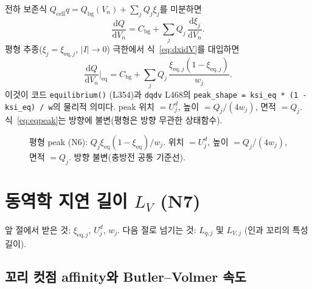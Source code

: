 \documentclass[11pt,a4paper]{article}
\newcommand{\dd}{\mathrm{d}}
\newcommand{\eq}{\mathrm{eq}}
\newcommand{\cell}{\mathrm{cell}}
\newcommand{\bg}{\mathrm{bg}}
\begin{document}
전하 보존식 $Q_\cell q = Q_\bg(V_n) + \sum_j Q_j\xi_j$를 미분하면
\begin{equation}
  \frac{\dd Q}{\dd V_n} = C_\bg + \sum_j Q_j\,\frac{\dd\xi_j}{\dd V_n}.
  \label{eq:dQdV}
\end{equation}
평형 추종($\xi_j = \xi_{\eq,j}$, $|I|\to0$) 극한에서 식~\eqref{eq:dxidV}를 대입하면
\begin{equation}
  \boxed{\frac{\dd Q}{\dd V_n}\bigg|_{\eq} = C_\bg + \sum_j Q_j\,
  \frac{\xi_{\eq,j}(1-\xi_{\eq,j})}{w_j}.}
  \label{eq:eqpeak}
\end{equation}
이것이 코드 \texttt{equilibrium()} (L354)과 \texttt{dqdv} L468의
\texttt{peak\_shape = ksi\_eq * (1 - ksi\_eq) / w}의 물리적 의미다.
peak 위치 $= U_j^d$, 높이 $= Q_j/(4w_j)$, 면적 $= Q_j$.
식~\eqref{eq:eqpeak}는 방향에 불변(평형은 방향 무관한 상태함수).

\begin{figure}[h]
\centering
{}
\caption{평형 peak (N6): $Q_j\xi_{\eq}(1-\xi_{\eq})/w_j$. 위치 $=U_j^d$,
높이 $=Q_j/(4w_j)$, 면적 $=Q_j$. 방향 불변(충방전 공통 기준선).}
\label{fig:eqpeak}
\end{figure}

\section{동역학 지연 길이 $L_V$ (N7)}
\label{sec:Lq}
앞 절에서 받은 것: $\xi_{\eq,j}$, $U_j^d$, $w_j$.
다음 절로 넘기는 것: $L_{q,j}$ 및 $L_{V,j}$ (인과 꼬리의 특성 길이).

\subsection{꼬리 컷점 affinity와 Butler--Volmer 속도}
\end{document}
